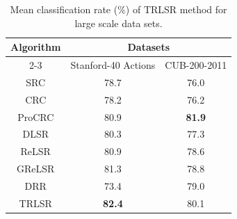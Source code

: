 \begin{table}
\caption{Mean classification rate ($\%$) of TRLSR method for large scale data sets.}
\label{table: Std_CUB}
\centering
\small
\begin{tabular}{|c|c|c|}
\hline
\multirow{2}{*}{\textbf{Algorithm}} & \multicolumn{2}{c|}{Datasets}                            \\ \cline{2-3} 
                                    & \multicolumn{1}{c|}{Stanford-40 Actions} & CUB-200-2011  \\ \hline
SRC                                 & \multicolumn{1}{c|}{78.7}                & 76.0          \\ \hline
CRC                                 & \multicolumn{1}{c|}{78.2}                & 76.2          \\ \hline
ProCRC                              & \multicolumn{1}{c|}{80.9}                & \textbf{81.9}          \\ \hline
DLSR                                & \multicolumn{1}{c|}{80.3}                & 77.3          \\ \hline
ReLSR                               & \multicolumn{1}{c|}{80.9}                & 78.6          \\ \hline
GReLSR                              & \multicolumn{1}{c|}{81.3}                & 78.8          \\ \hline
DRR                                 & \multicolumn{1}{c|}{73.4}                & 79.0          \\ \hline
TRLSR                               & \multicolumn{1}{c|}{\textbf{82.4}}       & 80.1 \\ \hline
\end{tabular}
\end{table}
